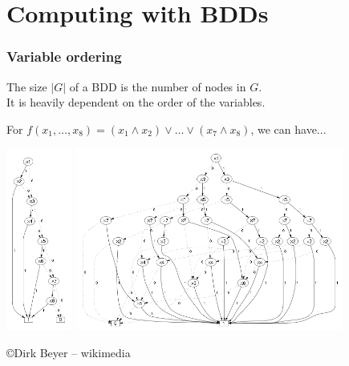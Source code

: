 \documentclass[10pt,a4paper,pdf]{beamer}
\begin{document}
\begin{frame}[t]
{\begin{minipage}[t]{.54\linewidth}
\begin{center}
\end{center}
\end{minipage}}
\end{frame}

\section{Computing with BDDs}

\begin{frame}
\frametitle{Variable ordering}

The size $|G|$ of a BDD is the number of nodes in $G$.\\
It is heavily dependent on the order of the variables.

For $f(x_1, \ldots, x_8) = (x_1 \land x_2) \lor \ldots \lor (x_7 \land x_8)$, we can have...

\includegraphics[height=6cm]{images/good.png}
\includegraphics[height=6cm]{images/bad.png}

{\tiny\copyright Dirk Beyer -- wikimedia}

\end{frame}
\end{document}
